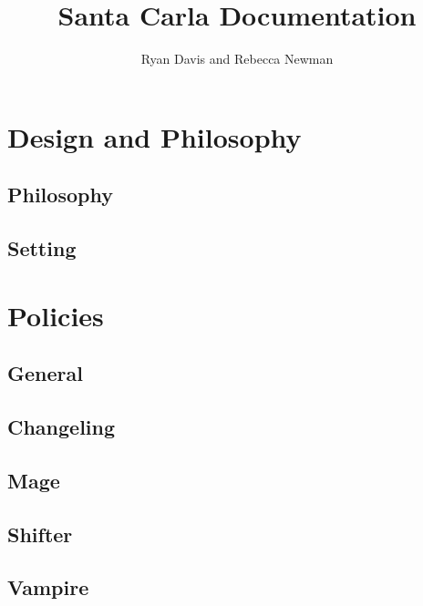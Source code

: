 \documentclass[letterpaper,twocolumn]{book}
\title{Santa Carla Documentation}
\author{Ryan Davis and Rebecca Newman}
\begin{document}
\pagestyle{empty}
\maketitle
\frontmatter
\pagestyle{headings}
\tableofcontents
\mainmatter
\part{Design and Philosophy}
\chapter{Philosophy}

\chapter{Setting}

\part{Policies}
\chapter{General}

\chapter{Changeling}
\chapter{Mage}
\chapter{Shifter}
\chapter{Vampire}
\end{document}
